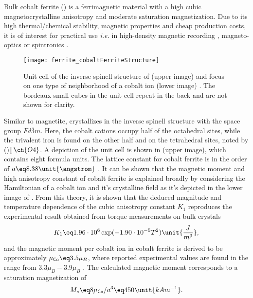 \documentclass[\main/dresen_thesis.tex]{subfiles}
\begin{document}
  Bulk cobalt ferrite () is a ferrimagnetic material with a high cubic magnetocrystalline anisotropy and moderate saturation magnetization.
  Due to its high thermal/chemical stability, magnetic properties and cheap production costs, it is of interest for practical use \textit{i.e.} in high-density magnetic recording \cite{Wu_2014_Monol}, magneto-optics \cite{Jung_2005_CoFe2} or spintronics \cite{Ramos_2007_Roomt}.

  \begin{figure}[tb]
    \centering
    \texttt{[image: ferrite\_cobaltFerriteStructure]}
    \caption{\label{fig:theoreticalBackground:ferrites:cofe2o4Structure}Unit cell of the inverse spinell structure of  (upper image) \cite{Sickafus_1999_Struc} and focus on one type of neighborhood of a cobalt ion (lower image) \cite{Tachiki_1960_Origi}. The bordeaux small cubes in the unit cell repeat in the back and are not shown for clarity.}
  \end{figure}

  Similar to magnetite,  crystallizes in the inverse spinell structure with the space group $Fd\bar{3}m$.
  Here, the cobalt cations occupy half of the octahedral sites, while the trivalent iron is found on the other half and on the tetrahedral sites, noted by ()[]$\ch{O4}$.
  A depiction of the unit cell is shown in  (upper image), which contains eight formula units.
  The lattice constant for cobalt ferrite is in the order of $a \eq 8.38 \unit{\angstrom}$ \cite{Goldman_1999_Cryst}.
  It can be shown that the magnetic moment and high anisotropy constant of cobalt ferrite is explained broadly by considering the Hamiltonian of a cobalt ion and it's crystalline field as it's depicted in the lower image of  \cite{Slonczewski_1958_Origi, Tachiki_1960_Origi}.
  From this theory, it is shown that the deduced magnitude and temperature dependence of the cubic anisotropy constant $K_1$ reproduces the experimental result obtained from torque measurements on bulk crystals \cite{Shenker_1957_Magne}
  \begin{align}
    K_1 \eq 1.96 \cdot 10^6 \exp(-1.90 \cdot 10^{-5} T^2) \unit{\frac{J}{m^3}},
  \end{align}
  and the magnetic moment per cobalt ion in cobalt ferrite is derived to be approximately $\mu_\textsf{Co} \eq 3.5 \mu_B$, where reported experimental values are found in the range from $3.3 \mu_B - 3.9 \mu_B$ \cite{Tachiki_1960_Origi}.
  The calculated magnetic moment corresponds to a saturation magnetization of
  \begin{align}
    M_s \eq 8\mu_\textsf{Co}/a^3 \eq 450 \unit{kAm^{-1}}.
  \end{align}
\end{document}
